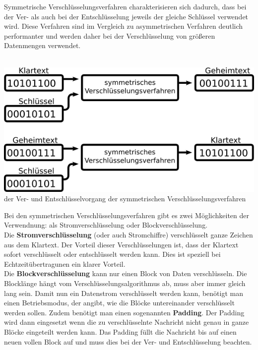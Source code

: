 \documentclass[12pt,a4paper]{report}
\begin{document}
Symmetrische Verschlüsselungsverfahren charakterisieren sich dadurch, dass bei der Ver- als auch bei der Entschlüsselung jeweils der gleiche Schlüssel verwendet wird. Diese Verfahren sind im Vergleich zu asymmetrischen Verfahren deutlich performanter und werden daher bei der Verschlüsselung von größeren Datenmengen verwendet.\\\\

\begin{center}
\includegraphics[scale=3]{img/sym.png}\\
der Ver- und Entschlüsselvorgang der symmetrischen Verschlüsselungsverfahren
\end{center}

Bei den symmetrischen Verschlüsselungsverfahren gibt es zwei Möglichkeiten der Verwendnung: als Stromverschlüsselung oder Blockverschlüsselung.\\
Die \textbf{Stromverschlüsselung} (oder auch Stromchiffre) verschlüsselt ganze Zeichen aus dem Klartext. Der Vorteil dieser Verschlüsselungen ist, dass der Klartext sofort verschlüsselt oder entschlüsselt werden kann. Dies ist speziell bei Echtzeitübertragunen ein klarer Vorteil.\\
Die \textbf{Blockverschlüsselung} kann nur einen Block von Daten verschlüsseln. Die Blocklänge hängt vom Verschlüsselungsalgorithmus ab, muss aber immer gleich lang sein. Damit nun ein Datenstrom verschlüsselt werden kann, benötigt man einen Betriebsmodus, der angibt, wie die Blöcke untereinander verschlüsselt werden sollen. Zudem benötigt man einen sogenannten \textbf{Padding}. Der Padding wird dann eingesetzt wenn die zu verschlüsselnte Nachricht nicht genau in ganze Blöcke eingeteilt werden kann. Das Padding füllt die Nachricht bis auf einen neuen vollen Block auf und muss dies bei der Ver- und Entschlüsselung beachten.\\
\end{document}
